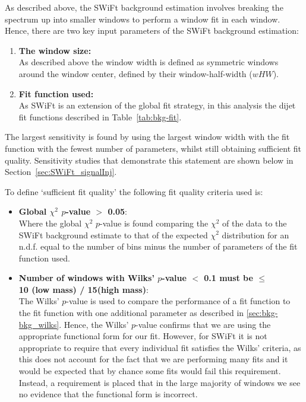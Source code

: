As described above, the SWiFt background estimation involves breaking the spectrum up into smaller windows to perform a window fit in each window.
Hence, there are two key input parameters of the SWiFt background estimation:
\begin{enumerate}[leftmargin=*]
\item \textbf{The window size:}\\
  As described above the window width is defined as symmetric windows around the window center, defined by their window-half-width ($wHW$).\vspace{0.5em}
\item \textbf{Fit function used:}\\
  As SWiFt is an extension of the global fit strategy,
  in this analysis the dijet fit functions described in Table~\ref{tab:bkg-fit}.
\end{enumerate}
The largest sensitivity is found by using the largest window width with the fit function with the fewest number of parameters, whilst still obtaining sufficient fit quality.
Sensitivity studies that demonstrate this statement are shown below in Section~\ref{sec:SWiFt_signalInj}.

\noindent
To define `sufficient fit quality' the following fit quality criteria used is:
\begin{itemize}[leftmargin=*]
  
\item \textbf{Global $\chi^{2}$ $p$-value $>$ 0.05}:\\
  Where the global $\chi^{2}$ $p$-value is found comparing the $\chi^{2}$ of the data to the SWiFt background estimate
  to that of the expected  $\chi^{2}$ distribution for an n.d.f. equal to the number of bins minus the number of parameters of the fit function used.\vspace{0.5em}
  
\item \textbf{Number of windows with Wilks' $p$-value $<$ 0.1 must be $\leq$ \\10 (low mass) / 15(high mass)}:\\
  The Wilks' $p$-value is used to compare the performance of a fit function to the fit function with one additional parameter
  as described in \ref{sec:bkg-bkg_wilks}. Hence, the Wilks' $p$-value confirms that we are using the appropriate functional form for our fit.
  However, for SWiFt it is not appropriate to require that every individual fit satisfies the Wilks' criteria,
  as this does not account for the fact that we are performing many fits and it would be expected that by chance some fits would fail this requirement.
  Instead, a requirement is placed that in the large majority of windows we see no evidence that the functional form is incorrect.
\end{itemize}

